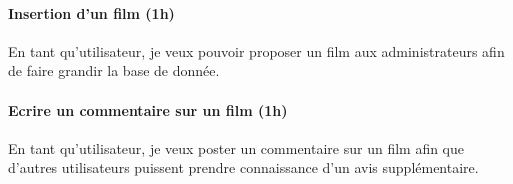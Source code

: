 \documentclass[a4paper,12pt]{article}
\begin{document}
\paragraph{Insertion d'un film (1h)}
En tant qu'utilisateur, je veux pouvoir proposer un film aux administrateurs afin de faire grandir la base de donnée.

\paragraph{Ecrire un commentaire sur un film (1h)}
En tant qu'utilisateur, je veux poster un commentaire sur un film afin que d'autres utilisateurs puissent prendre connaissance d'un avis supplémentaire.
\end{document}
